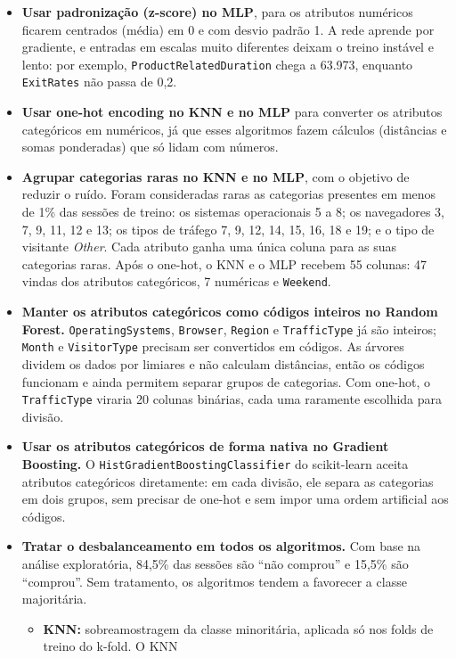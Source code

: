 \documentclass[11pt,a4paper]{article}
\DeclareRobustCommand{\atr}[1]{{\renewcommand{\_}{\textunderscore\allowbreak}\texttt{#1}}}
\begin{document}
\begin{itemize}
  \item \textbf{Usar padronização (z-score) no MLP}, para os atributos numéricos ficarem centrados (média) em 0 e com
        desvio padrão 1. A rede aprende por gradiente, e entradas em escalas muito diferentes deixam o treino instável
        e lento: por exemplo, \atr{ProductRelated\_Duration} chega a 63.973, enquanto \atr{ExitRates} não passa de
        0,2.
  \item \textbf{Usar one-hot encoding no KNN e no MLP} para converter os atributos categóricos em numéricos, já que
        esses algoritmos fazem cálculos (distâncias e somas ponderadas) que só lidam com números.
  \item \textbf{Agrupar categorias raras no KNN e no MLP}, com o objetivo de reduzir o ruído. Foram consideradas
        raras as categorias presentes em menos de 1\% das sessões de treino: os sistemas operacionais 5 a 8; os
        navegadores 3, 7, 9, 11, 12 e 13; os tipos de tráfego 7, 9, 12, 14, 15, 16, 18 e 19; e o tipo de visitante
        \textit{Other}. Cada atributo ganha uma única coluna para as suas categorias raras. Após o one-hot, o KNN e o
        MLP recebem 55 colunas: 47 vindas dos atributos categóricos, 7 numéricas e \atr{Weekend}.
  \item \textbf{Manter os atributos categóricos como códigos inteiros no Random Forest.} \atr{OperatingSystems},
        \atr{Browser}, \atr{Region} e \atr{TrafficType} já são inteiros; \atr{Month} e \atr{VisitorType} precisam ser
        convertidos em códigos. As árvores dividem os dados por limiares e não calculam distâncias, então os códigos
        funcionam e ainda permitem separar grupos de categorias. Com one-hot, o \atr{TrafficType} viraria 20 colunas
        binárias, cada uma raramente escolhida para divisão.
  \item \textbf{Usar os atributos categóricos de forma nativa no Gradient Boosting.} O
        \atr{HistGradientBoostingClassifier} do scikit-learn aceita atributos categóricos diretamente: em cada
        divisão, ele separa as categorias em dois grupos, sem precisar de one-hot e sem impor uma ordem artificial aos
        códigos.
  \item \textbf{Tratar o desbalanceamento em todos os algoritmos.} Com base na análise exploratória, 84,5\% das
        sessões são ``não comprou'' e 15,5\% são ``comprou''. Sem tratamento, os algoritmos tendem a favorecer a
        classe majoritária.
        \begin{itemize}
          \item \textbf{KNN:} sobreamostragem da classe minoritária, aplicada só nos folds de treino do k-fold. O KNN

\end{itemize}
\end{itemize}
\end{document}
